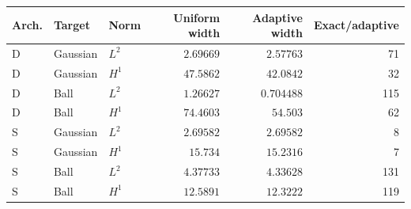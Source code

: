 \begin{tabular}{@{}lllrrr@{}}
\toprule
Arch. & Target & Norm & Uniform width & Adaptive width & Exact/adaptive \\
\midrule
D & Gaussian & $L^2$ & $2.69669$ & $2.57763$ & 71 \\
D & Gaussian & $H^1$ & $47.5862$ & $42.0842$ & 32 \\
D & Ball & $L^2$ & $1.26627$ & $0.704488$ & 115 \\
D & Ball & $H^1$ & $74.4603$ & $54.503$ & 62 \\
S & Gaussian & $L^2$ & $2.69582$ & $2.69582$ & 8 \\
S & Gaussian & $H^1$ & $15.734$ & $15.2316$ & 7 \\
S & Ball & $L^2$ & $4.37733$ & $4.33628$ & 131 \\
S & Ball & $H^1$ & $12.5891$ & $12.3222$ & 119 \\
\bottomrule
\end{tabular}
